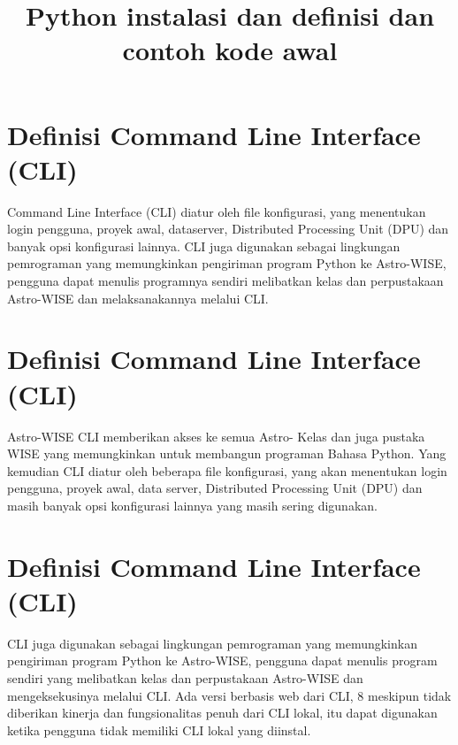 \documentclass[12pt, times new roman, a4paper]{article}
\begin{document}
\title{Python instalasi dan definisi dan contoh kode awal}
\maketitle


\section{Definisi Command Line Interface (CLI)}
Command Line Interface (CLI) diatur oleh file konfigurasi, yang menentukan login pengguna, proyek awal, dataserver, Distributed Processing Unit (DPU) dan banyak opsi konfigurasi lainnya. CLI juga digunakan sebagai lingkungan pemrograman yang memungkinkan pengiriman program Python ke Astro-WISE, pengguna dapat menulis programnya sendiri melibatkan kelas dan perpustakaan Astro-WISE dan melaksanakannya melalui CLI.

\section{Definisi Command Line Interface (CLI)}
Astro-WISE CLI memberikan  akses ke semua Astro- Kelas dan juga  pustaka WISE yang memungkinkan untuk membangun programan  Bahasa Python. Yang kemudian CLI diatur oleh beberapa file konfigurasi, yang akan menentukan login pengguna, proyek awal, data server, Distributed Processing Unit (DPU) dan masih banyak opsi konfigurasi lainnya yang masih  sering digunakan.

\section{Definisi Command Line Interface (CLI)}
CLI juga digunakan sebagai lingkungan pemrograman yang memungkinkan pengiriman program Python ke Astro-WISE, pengguna dapat menulis program sendiri yang melibatkan kelas dan perpustakaan Astro-WISE dan mengeksekusinya melalui CLI. Ada versi berbasis web dari CLI, 8 meskipun tidak diberikan kinerja dan fungsionalitas penuh dari CLI lokal, itu dapat digunakan ketika pengguna tidak memiliki CLI lokal yang diinstal.
\end{document}
